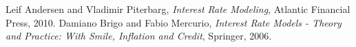 \documentclass[12pt]{article}
\begin{document}
\begin{thebibliography}{1}

 Leif Andersen and Vladimir Piterbarg, {\it Interest Rate Modeling}, Atlantic Financial Press, 2010.
 Damiano Brigo and Fabio Mercurio, {\it Interest Rate Models - Theory and Practice: With Smile, Inflation and Credit}, Springer, 2006.


\end{thebibliography}
\end{document}
